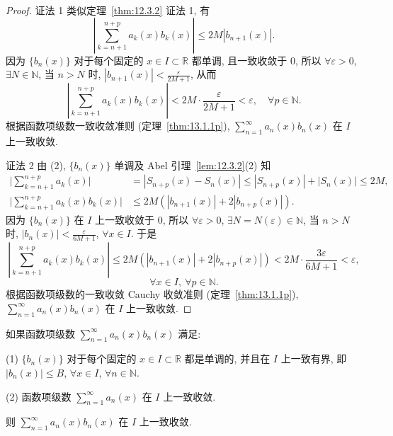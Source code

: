 \begin{proof}
证法 1 类似定理~\ref{thm:12.3.2} 证法 1, 有
\[
  \left|\sum_{k=n+1}^{n+p}a_{k}(x)b_{k}(x)\right|\leqslant2M|b_{n+1}(x)|.
\]
因为 $\{b_{n}(x)\}$ 对于每个固定的 $x\in I\subset\mathbb{R}$ 都单调, 且一致收敛于 $0$, 所以 $\forall\varepsilon>0$, $\exists N\in\mathbb{N}$, 当 $n>N$ 时, $|b_{n+1}(x)|<\frac{\varepsilon}{2M+1}$, 从而
\[
  \left|\sum_{k=n+1}^{n+p}a_{k}(x)b_{k}(x)\right|<2M\cdot\frac{\varepsilon}{2M+1}<\varepsilon,\quad\forall p\in\mathbb{N}.
\]
根据函数项级数一致收敛准则 (定理~\ref{thm:13.1.1p}), $\sum_{n=1}^{\infty}a_{n}(x)b_{n}(x)$ 在 $I$ 上一致收敛.

证法 2 由 (2), $\{b_{n}(x)\}$ 单调及 Abel 引理~\ref{lem:12.3.2}(2) 知
\[
  \begin{aligned}
    \Big|\sum_{k=n+1}^{n+p}a_{k}(x)\Big|&=|S_{n+p}(x)-S_{n}(x)|\leqslant|S_{n+p}(x)|+|S_{n}(x)|\leqslant2M,\\
    \Big|\sum_{k=n+1}^{n+p}a_{k}(x)b_{k}(x)\Big|&\leqslant2M(|b_{n+1}(x)|+2|b_{n+p}(x)|).
  \end{aligned}
\]
因为 $\{b_{n}(x)\}$ 在 $I$ 上一致收敛于 $0$, 所以 $\forall\varepsilon>0$, $\exists N=N(\varepsilon)\in\mathbb{N}$, 当 $n>N$ 时, $|b_{n}(x)|<\frac{\varepsilon}{6M+1}$, $\forall x\in I$. 于是
\[
  \left|\sum_{k=n+1}^{n+p}a_{k}(x)b_{k}(x)\right|\leqslant2M(|b_{n+1}(x)|+2|b_{n+p}(x)|)<2M\cdot\frac{3\varepsilon}{6M+1}<\varepsilon,
\]
\[
  \forall x\in I,\ \forall p\in\mathbb{N}.
\]
根据函数项级数的一致收敛 Cauchy 收敛准则 (定理~\ref{thm:13.1.1p}), $\sum_{n=1}^{\infty}a_{n}(x)b_{n}(x)$ 在 $I$ 上一致收敛.
\end{proof}

\begin{theorem}\label{thm:13.1.5}
如果函数项级数 $\sum_{n=1}^{\infty}a_{n}(x)b_{n}(x)$ 满足:

(1) $\{b_{n}(x)\}$ 对于每个固定的 $x\in I\subset\mathbb{R}$ 都是单调的, 并且在 $I$ 上一致有界, 即 $|b_{n}(x)|\leqslant B$, $\forall x\in I$, $\forall n\in\mathbb{N}$.

(2) 函数项级数 $\sum_{n=1}^{\infty}a_{n}(x)$ 在 $I$ 上一致收敛.

则 $\sum_{n=1}^{\infty}a_{n}(x)b_{n}(x)$ 在 $I$ 上一致收敛.
\end{theorem}

